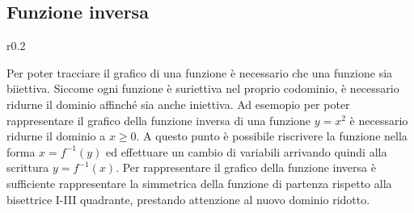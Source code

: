 \documentclass{article}     %
\begin{document}
    \subsection{Funzione inversa}
        \begin{wrapfigure}[9]{r}{0.2\textwidth}
            \begin{center}
            \end{center}
        \end{wrapfigure}
        Per poter tracciare il grafico di una funzione è necessario che una funzione sia biiettiva. Siccome ogni funzione è suriettiva nel proprio codominio, è necessario ridurne il dominio affinché sia anche iniettiva. Ad esemopio per poter rappresentare il grafico della funzione inversa di una funzione $y=x^2$ è necessario ridurne il dominio a $x\geq0$. A questo punto è possibile riscrivere la funzione nella forma $x=f^{-1}(y)$ ed effettuare un cambio di variabili arrivando quindi alla scrittura $y=f^{-1}(x)$. Per rappresentare il grafico della funzione inversa è sufficiente rappresentare la simmetrica della funzione di partenza rispetto alla bisettrice I-III quadrante, prestando attenzione al nuovo dominio ridotto.
\end{document}
